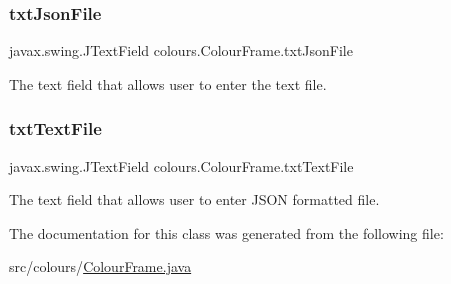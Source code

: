 \subsubsection{\texorpdfstring{txt\+Json\+File}{txtJsonFile}}
{\footnotesize\ttfamily javax.\+swing.\+J\+Text\+Field colours.\+Colour\+Frame.\+txt\+Json\+File\hspace{0.3cm}{\ttfamily [private]}}

The text field that allows user to enter the text file. \mbox{\label{classcolours_1_1_colour_frame_a8acb908d5dbadca9e110960051340977}} 
\subsubsection{\texorpdfstring{txt\+Text\+File}{txtTextFile}}
{\footnotesize\ttfamily javax.\+swing.\+J\+Text\+Field colours.\+Colour\+Frame.\+txt\+Text\+File\hspace{0.3cm}{\ttfamily [private]}}

The text field that allows user to enter J\+S\+ON formatted file. 

The documentation for this class was generated from the following file\+:\begin{DoxyCompactItemize}
\item 
src/colours/\hyperlink{_colour_frame_8java}{Colour\+Frame.\+java}\end{DoxyCompactItemize}

